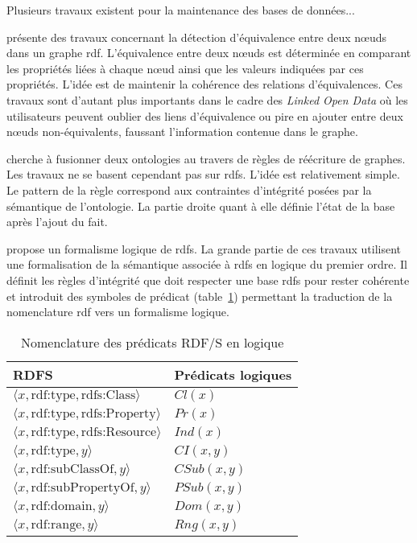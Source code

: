Plusieurs travaux existent pour la maintenance des bases de données...

\cite{raadDetectionLiensIdentite2017} présente des travaux concernant la détection d'équivalence entre deux nœuds dans un graphe \gls{rdf}.
L'équivalence entre deux nœuds est déterminée en comparant les propriétés liées à chaque nœud ainsi que les valeurs indiquées par ces propriétés.
L'idée est de maintenir la cohérence des relations d'équivalences.
Ces travaux sont d'autant plus importants dans le cadre des \textit{Linked Open Data} où les utilisateurs peuvent oublier des liens d'équivalence ou pire en ajouter entre deux nœuds non-équivalents, faussant l'information contenue dans le graphe.

\cite{mahfoudhAdaptationOntologiesAvec2015} cherche à fusionner deux ontologies au travers de règles de réécriture de graphes. Les travaux ne se basent cependant pas sur \gls{rdfs}. L'idée est relativement simple. Le pattern de la règle correspond aux contraintes d'intégrité posées par la sémantique de l'ontologie. La partie droite quant à elle définie l'état de la base après l'ajout du fait.

\cite{flourisFormalFoundationsRDF2013} propose un formalisme logique de \gls{rdfs}.
La grande partie de ces travaux utilisent une formalisation de la sémantique associée à \gls{rdfs} en logique du premier ordre.
Il définit les règles d'intégrité que doit respecter une base \gls{rdfs} pour rester cohérente et introduit des symboles de prédicat (table~\ref{table:update:soa:rdfs}) permettant la traduction de la nomenclature \gls{rdf} vers un formalisme logique.

\begin{table}
    \centering
    \begin{tabular}{|l|l|}
        \hline
        RDFS                                                       & Prédicats logiques \\
        \hline
        $\langle x, \text{rdf:type}, \text{rdfs:Class} \rangle$    & $Cl(x)$            \\
        $\langle x, \text{rdf:type}, \text{rdfs:Property} \rangle$ & $Pr(x)$            \\
        $\langle x, \text{rdf:type}, \text{rdfs:Resource} \rangle$ & $Ind(x)$           \\
        $\langle x, \text{rdf:type}, y \rangle$                    & $CI(x, y)$         \\
        $\langle x, \text{rdf:subClassOf}, y \rangle$              & $CSub(x, y)$       \\
        $\langle x, \text{rdf:subPropertyOf}, y \rangle$           & $PSub(x, y)$       \\
        $\langle x, \text{rdf:domain}, y \rangle$                  & $Dom(x, y)$        \\
        $\langle x, \text{rdf:range}, y \rangle$                   & $Rng(x, y)$        \\
        \hline
    \end{tabular}
    \caption{Nomenclature des prédicats RDF/S en logique}
    \label{table:update:soa:rdfs}
\end{table}
